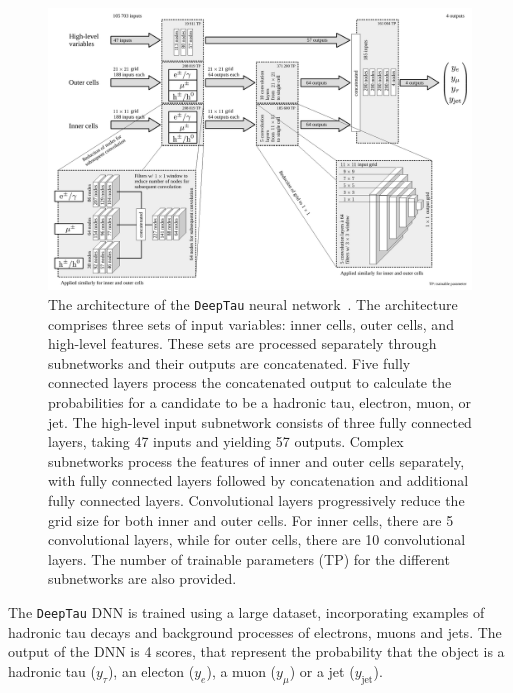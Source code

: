 \begin{figure}[!hbtp]
\centering
    \includegraphics[width=\textwidth]{Figures/deeptau.pdf}
\caption{The architecture of the \texttt{DeepTau} neural network~\cite{CMS:2022prd}. The architecture comprises three sets of input variables: inner cells, outer cells, and high-level features. These sets are processed separately through subnetworks and their outputs are concatenated. Five fully connected layers process the concatenated output to calculate the probabilities for a candidate to be a hadronic tau, electron, muon, or jet. The high-level input subnetwork consists of three fully connected layers, taking 47 inputs and yielding 57 outputs. Complex subnetworks process the features of inner and outer cells separately, with fully connected layers followed by concatenation and additional fully connected layers. Convolutional layers progressively reduce the grid size for both inner and outer cells. For inner cells, there are 5 convolutional layers, while for outer cells, there are 10 convolutional layers. The number of trainable parameters (TP) for the different subnetworks are also provided.}
\label{fig:deeptau}
\end{figure}

The \texttt{DeepTau} \ac{DNN} is trained using a large dataset, incorporating examples of hadronic tau decays and background processes of electrons, muons and jets. 
The output of the \ac{DNN} is 4 scores, that represent the probability that the object is a hadronic tau ($y_\tau$), an electon ($y_e$), a muon ($y_\mu$) or a jet ($y_{\text{jet}}$).
